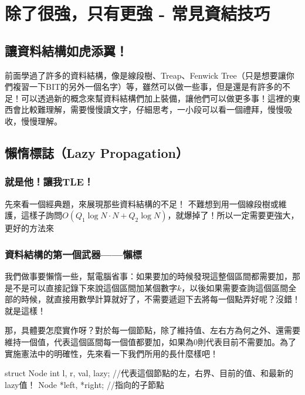 \documentclass[main.tex]{subfiles}
\begin{document}
\chapter{除了很強，只有更強 - 常見資結技巧}
	\section{讓資料結構如虎添翼！}
		前面學過了許多的資料結構，像是線段樹、Treap、Fenwick Tree（只是想要讓你們複習一下BIT的另外一個名字）等，雖然可以做一些事，但是還是有許多的不足！可以透過新的概念來幫資料結構們加上裝備，讓他們可以做更多事！這裡的東西會比較難理解，需要慢慢讀文字，仔細思考，一小段可以看一個禮拜，慢慢吸收，慢慢理解。
	\section{懶惰標誌（Lazy Propagation）}
		\subsection{就是他！讓我TLE！}
			先來看一個經典題，來展現那些資料結構的不足！
			不難想到用一個線段樹或維護，這樣子詢問$O(Q_1 \log N\cdot N + Q_2 \log N)$，就爆掉了！所以一定需要更強大，更好的方法來
		\subsection{資料結構的第一個武器——懶標}
			我們做事要懶惰一些，幫電腦省事：如果要加的時候發現這整個區間都需要加，那是不是可以直接記錄下來說這個區間加某個數字$k$，以後如果需要查詢這個區間全部的時候，就直接用數學計算就好了，不需要遞迴下去將每一個點弄好呢？沒錯！就是這樣！
			
			那，具體要怎麼實作呀？對於每一個節點，除了維持值、左右方為何之外、還需要維持一個值，代表這個區間每一個值都要加，如果為$0$則代表目前不需要加。為了實施憲法中的明確性，先來看一下我們所用的長什麼樣吧！
			\begin{C++}
struct Node{
	int l, r, val, lazy; //代表這個節點的左，右界、目前的值、和最新的lazy值！
	Node *left, *right; //指向的子節點
}
			\end{C++}
\end{document}
